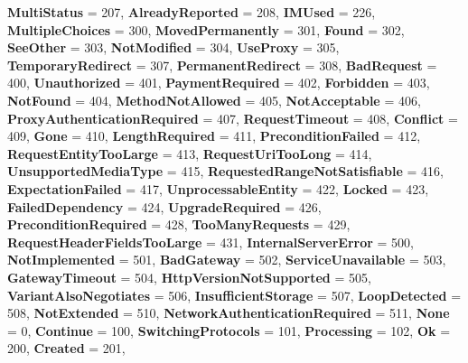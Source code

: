 \begin{DoxyCompactItemize}
{\bfseries Multi\+Status} = 207, 
{\bfseries Already\+Reported} = 208, 
{\bfseries I\+M\+Used} = 226, 
\newline
{\bfseries Multiple\+Choices} = 300, 
{\bfseries Moved\+Permanently} = 301, 
{\bfseries Found} = 302, 
{\bfseries See\+Other} = 303, 
\newline
{\bfseries Not\+Modified} = 304, 
{\bfseries Use\+Proxy} = 305, 
{\bfseries Temporary\+Redirect} = 307, 
{\bfseries Permanent\+Redirect} = 308, 
\newline
{\bfseries Bad\+Request} = 400, 
{\bfseries Unauthorized} = 401, 
{\bfseries Payment\+Required} = 402, 
{\bfseries Forbidden} = 403, 
\newline
{\bfseries Not\+Found} = 404, 
{\bfseries Method\+Not\+Allowed} = 405, 
{\bfseries Not\+Acceptable} = 406, 
{\bfseries Proxy\+Authentication\+Required} = 407, 
\newline
{\bfseries Request\+Timeout} = 408, 
{\bfseries Conflict} = 409, 
{\bfseries Gone} = 410, 
{\bfseries Length\+Required} = 411, 
\newline
{\bfseries Precondition\+Failed} = 412, 
{\bfseries Request\+Entity\+Too\+Large} = 413, 
{\bfseries Request\+Uri\+Too\+Long} = 414, 
{\bfseries Unsupported\+Media\+Type} = 415, 
\newline
{\bfseries Requested\+Range\+Not\+Satisfiable} = 416, 
{\bfseries Expectation\+Failed} = 417, 
{\bfseries Unprocessable\+Entity} = 422, 
{\bfseries Locked} = 423, 
\newline
{\bfseries Failed\+Dependency} = 424, 
{\bfseries Upgrade\+Required} = 426, 
{\bfseries Precondition\+Required} = 428, 
{\bfseries Too\+Many\+Requests} = 429, 
\newline
{\bfseries Request\+Header\+Fields\+Too\+Large} = 431, 
{\bfseries Internal\+Server\+Error} = 500, 
{\bfseries Not\+Implemented} = 501, 
{\bfseries Bad\+Gateway} = 502, 
\newline
{\bfseries Service\+Unavailable} = 503, 
{\bfseries Gateway\+Timeout} = 504, 
{\bfseries Http\+Version\+Not\+Supported} = 505, 
{\bfseries Variant\+Also\+Negotiates} = 506, 
\newline
{\bfseries Insufficient\+Storage} = 507, 
{\bfseries Loop\+Detected} = 508, 
{\bfseries Not\+Extended} = 510, 
{\bfseries Network\+Authentication\+Required} = 511, 
\newline
{\bfseries None} = 0, 
{\bfseries Continue} = 100, 
{\bfseries Switching\+Protocols} = 101, 
{\bfseries Processing} = 102, 
\newline
{\bfseries Ok} = 200, 
{\bfseries Created} = 201, 

\end{DoxyCompactItemize}
